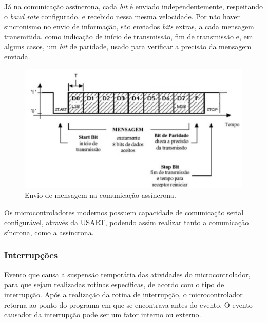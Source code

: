Já na comunicação assíncrona, cada \textit{bit} é enviado independentemente, respeitando o \textit{baud rate} configurado, e recebido nessa mesma velocidade. Por não haver sincronismo no envio de informação, são enviados \textit{bits} extras, a cada mensagem transmitida, como indicação de início de transmissão, fim de transmissão e, em alguns casos, um \textit{bit} de paridade, usado para verificar a precisão da mensagem enviada.

\begin{figure}[ht]
    \begin{center}
    \includegraphics{figuras/assincrono.PNG}
    \end{center}
    \caption[Comunicação assíncrona]{Envio de mensagem na comunicação assíncrona.}
    \label{assincrono}
\end{figure}

Os microcontroladores modernos possuem capacidade de comunicação serial configurável, através da \ac{USART}, podendo assim realizar tanto a comunicação síncrona, como a assíncrona.

\subsubsection{Interrupções}

Evento que causa a suspensão temporária das atividades do microcontrolador, para que sejam realizadas rotinas específicas, de acordo com o tipo de interrupção. Após a realização da rotina de interrupção, o microcontrolador retorna ao ponto do programa em que se encontrava antes do evento. O evento causador da interrupção pode ser um fator interno ou externo\cite{8051}. %

